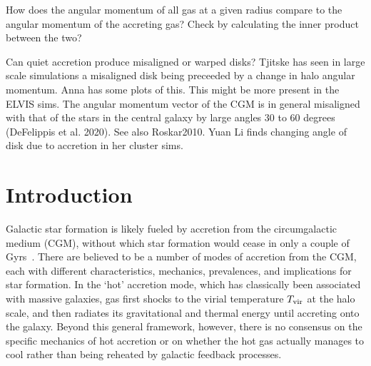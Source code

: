 \documentclass[fleqn,usenatbib]{mnras}
\newcommand{\Tvir}{T_{\rm vir}}
\begin{document}
How does the angular momentum of all gas at a given radius compare to the angular momentum of the accreting gas?
Check by calculating the inner product between the two?

Can quiet accretion produce misaligned or warped disks?
Tjitske has seen in large scale simulations a misaligned disk being preceeded by a change in halo angular momentum.
Anna has some plots of this. This might be more present in the ELVIS sims.
The angular momentum vector of the CGM is in general misaligned with that of the stars in the central galaxy by large angles  30 to 60 degrees (DeFelippis et al. 2020).
See also Roskar2010.
Yuan Li finds changing angle of disk due to accretion in her cluster sims.

\section{Introduction}
\label{s: introduction}

Galactic star formation is likely fueled by accretion from the circumgalactic medium (CGM), without which star formation would cease in only a couple of Gyrs~\cite[e.g.][]{Prochaska2009, Bauermeister2010, Spring2017}.
There are believed to be a number of modes of accretion from the CGM, each with different characteristics, mechanics, prevalences, and implications for star formation.
In the `hot' accretion mode, which has classically been associated with massive galaxies, gas first shocks to the virial temperature $\Tvir$ at the halo scale, and then radiates its gravitational and thermal energy until accreting onto the galaxy. Beyond this general framework, however, there is no consensus on the specific mechanics of hot accretion or on whether the hot gas actually manages to cool rather than being reheated by galactic feedback processes. 
\end{document}
